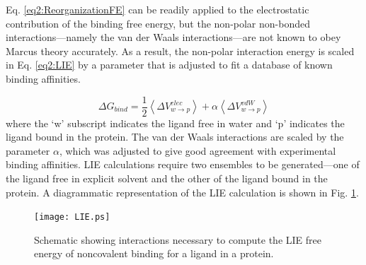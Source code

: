 Eq. \ref{eq2:ReorganizationFE} can be readily applied to the electrostatic
contribution of the binding free energy, but the non-polar non-bonded
interactions---namely the van der Waals interactions---are not known to obey
Marcus theory accurately. As a result, the non-polar interaction energy is
scaled in Eq. \ref{eq2:LIE} by a parameter that is adjusted to fit a database of
known binding affinities. \cite{Aqvist_ProteinEng_1994_v7_p385}

\begin{equation}
   \Delta G_{bind} = \frac 1 2 \left \langle \Delta V_{w \rightarrow p} ^{elec}
         \right \rangle + \alpha \left \langle \Delta V_{w \rightarrow p} ^{vdW}
         \right \rangle
   \label{eq2:LIE}
\end{equation}
where the `w' subscript indicates the ligand free in water and `p' indicates the
ligand bound in the protein. The van der Waals interactions are scaled by the
parameter $\alpha$, which was adjusted to give good agreement with experimental
binding affinities. LIE calculations require two ensembles to be generated---one
of the ligand free in explicit solvent and the other of the ligand bound in the
protein. A diagrammatic representation of the LIE calculation is shown in Fig.
\ref{fig2:LIE}.

\begin{figure}
   \texttt{[image: LIE.ps]}
   \caption{Schematic showing interactions necessary to compute the LIE free
            energy of noncovalent binding for a ligand in a protein.}
   \label{fig2:LIE}
\end{figure}
